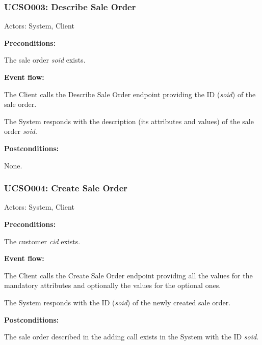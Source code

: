 \begin{ucbox}{\subsubsection{UCSO003: Describe Sale Order}}
\label{UCSO003}

Actors: System, Client

\textbf{Preconditions:}

\ucitem The sale order \textit{soid} exists.

\textbf{Event flow:}

\ucitem The Client calls the Describe Sale Order endpoint providing the ID (\textit{soid}) of the sale order.

\ucitem The System responds with the description (its attributes and values) of the sale order \textit{soid}.

\textbf{Postconditions:}

\ucitem None.

\end{ucbox}

\begin{ucbox}{\subsubsection{UCSO004: Create Sale Order}}
\label{UCSO004}

Actors: System, Client

\textbf{Preconditions:}

\ucitem The customer \textit{cid} exists.

\textbf{Event flow:}

\ucitem The Client calls the Create Sale Order endpoint providing all the values for the mandatory attributes and optionally the values for the optional ones.

\ucitem The System responds with the ID (\textit{soid}) of the newly created sale order.

\textbf{Postconditions:}

\ucitem The sale order described in the adding call exists in the System with the ID \textit{soid}.

\end{ucbox}

